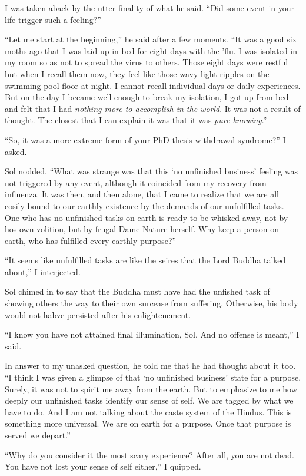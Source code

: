 \documentclass[
  a4paper,
]{article}
\begin{document}
I was taken aback by the utter finality of what he said. ``Did some
event in your life trigger such a feeling?''

``Let me start at the beginning,'' he said after a few moments. ``It was
a good six moths ago that I was laid up in bed for eight days with the
'flu. I was isolated in my room so as not to spread the virus to others.
Those eight days were restful but when I recall them now, they feel like
those wavy light ripples on the swimming pool floor at night. I cannot
recall individual days or daily experiences. But on the day I became
well enough to break my isolation, I got up from bed and felt that I had
\emph{nothing more to accomplish in the world}. It was not a result of
thought. The closest that I can explain it was that it was \emph{pure
knowing}.''

``So, it was a more extreme form of your PhD-thesis-withdrawal
syndrome?'' I asked.

Sol nodded. ``What was strange was that this `no unfinished business'
feeling was not triggered by any event, although it coincided from my
recovery from influenza. It was then, and then alone, that I came to
realize that we are all cosily bound to our earthly existence by the
demands of our unfulfilled tasks. One who has no unfinished tasks on
earth is ready to be whisked away, not by hos own volition, but by
frugal Dame Nature herself. Why keep a person on earth, who has
fulfilled every earthly purpose?''

``It seems like unfulfilled tasks are like the seires that the Lord
Buddha talked about,'' I interjected.

Sol chimed in to say that the Buddha must have had the unfished task of
showing others the way to their own surcease from suffering. Otherwise,
his body would not habve persisted after his enlightenement.

``I know you have not attained final illumination, Sol. And no offense
is meant,'' I said.

In answer to my unasked question, he told me that he had thought about
it too. ``I think I was given a glimpse of that `no unfinished business'
state for a purpose. Surely, it was not to spirit me away from the
earth. But to emphasize to me how deeply our unfinished tasks identify
our sense of self. We are tagged by what we have to do. And I am not
talking about the caste system of the Hindus. This is something more
universal. We are on earth for a purpose. Once that purpose is served we
depart.''

``Why do you consider it the most scary experience? After all, you are
not dead. You have not lost your sense of self either,'' I quipped.
\end{document}
